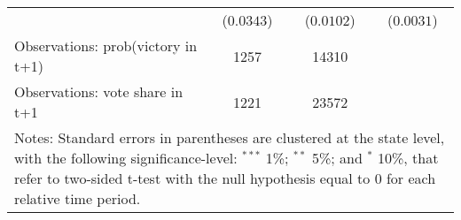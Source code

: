 \begin{table}[htbp]
{\begin{tabular}{lccc}
& ($ 0.0343$) & ($ 0.0102 $)  & ($ 0.0031 $)\\
\addlinespace
Observations: prob(victory in t+1)      &            1257        &     14310  \\
Observations: vote share in t+1      &            1221        &     23572  \\
\hline \hline
\multicolumn{4}{p{1\textwidth}}{\footnotesize{Notes: Standard errors in parentheses are clustered at the state level, with the following significance-level: $^{***}$ 1\%; $^{**}$ 5\%; and $^*$ 10\%, that refer to two-sided t-test with the null hypothesis equal to 0 for each relative time period.}}
\end{tabular}
}
\end{table}
